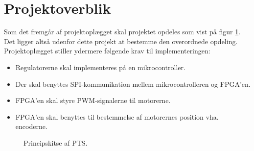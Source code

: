 \section{Projektoverblik}
\label{sec:projektoverblik}
Som det fremgår af projektoplægget skal projektet opdeles som vist på 
figur \ref{fig:overview_openloop_PTS}. 
Det ligger altså udenfor dette projekt at bestemme den overordnede opdeling.
Projektoplægget stiller ydermere følgende krav til implementeringen:
\begin{itemize}
\itemsep1pt
  \item Regulatorerne skal implementeres på en mikrocontroller.
  \item Der skal benyttes SPI-kommunikation mellem mikrocontrolleren og FPGA’en.
  \item FPGA’en skal styre PWM-signalerne til motorerne.
  \item FPGA’en skal benyttes til bestemmelse af motorernes position vha. encoderne.
\end{itemize}
\begin{figure}[!th]
\centering
\begin{tikzpicture}[auto, node distance=1cm,>=latex']

\end{tikzpicture}
\caption[Principskitse af PTS]{Principskitse af PTS.}
\label{fig:overview_openloop_PTS}
\end{figure}



